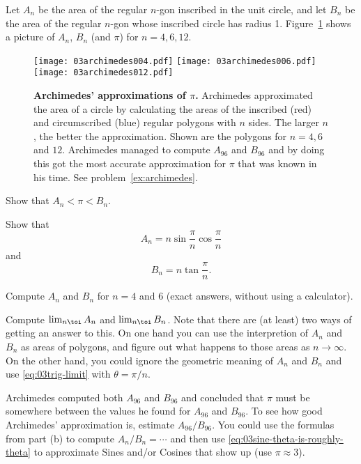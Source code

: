 

Let $A_n$ be the area of the regular $n$-gon inscribed in the unit
circle, and let $B_n$ be the area of the regular $n$-gon whose
inscribed circle has radius 1.  Figure~\ref{fig:03Archimedes} shows a
picture of $A_{n}$, $B_n$ (and $\pi$) for $n=4, 6, 12$.

\begin{figure}[b]
  \texttt{[image: 03archimedes004.pdf]}
  \texttt{[image: 03archimedes006.pdf]}
  \texttt{[image: 03archimedes012.pdf]}
  \caption{\textbf{Archimedes' approximations of $\pi$. } Archimedes
  approximated the area of a circle by calculating the areas of the
  inscribed (red) and circumscribed (blue) regular polygons with $n$ sides.  The
  larger $n$, the better the approximation.  Shown are the
  polygons for $n=4, 6$ and $12$.  Archimedes managed to compute
  $A_{96}$ and $B_{96}$ and by doing this got the most accurate
  approximation for $\pi$ that was known in his time.  See
  problem~\ref{ex:archimedes}.
  }
  \label{fig:03Archimedes}
\end{figure}

\subprob Show that $A_n < \pi < B_n$.

\subprob Show that
\[
A_n = n \sin\frac{\pi}{n} \cos\frac{\pi}{n}
\]
and
\[
B_n = n \tan\frac\pi n.
\]

\subprob Compute $A_n$ and $B_n$ for $n=4$ and $6$ (exact answers,
without using a calculator).

\subprob Compute $\lim_{n\toi}A_n$ and $\lim_{n\toi}B_n$.
Note that there are (at least) two ways of getting an answer to this.
On one hand you can use the interpretion of $A_n$ and $B_n$ as areas
of polygons, and figure out what happens to those areas as
$n\to\infty$.  On the other hand, you could ignore the geometric
meaning of $A_n$ and $B_n$ and use \ref{eq:03trig-limit} with
$\theta = \pi/n$.

\subprob Archimedes computed both $A_{96}$ and $B_{96}$ and concluded
that $\pi$ must be somewhere between the values he found for $A_{96}$
and $B_{96}$.  To see how good Archimedes' approximation is, estimate
$A_{96}/B_{96}$.  You could use the formulas from part (b) to compute
$A_n/B_n= \cdots$ and then use
\eqref{eq:03sine-theta-is-roughly-theta} to approximate Sines and/or
Cosines that show up (use $\pi\approx 3$).
